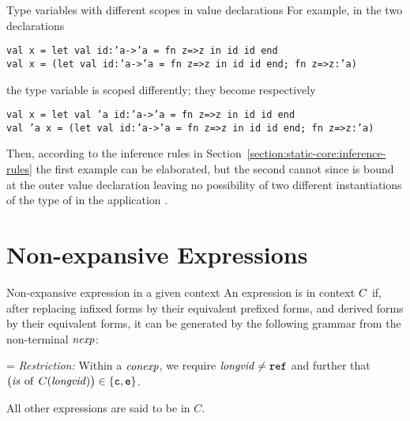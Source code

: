\begin{example}{Type variables with different scopes in value declarations}
For example, in the two declarations
\begin{tabbing}
\indent\=\tt  val x =  let val id:'a->'a = fn z=>z in id id end\\
       \>\tt  val x = (let val id:'a->'a = fn z=>z in id id end; fn z=>z:'a)
\end{tabbing}
the type variable  is scoped differently; they become respectively
\begin{tabbing}
\indent\=\tt val x =  let val 'a id:'a->'a = fn z=>z in id id end\\
       \>\tt val 'a x = (let val id:'a->'a = fn z=>z in id id end; fn z=>z:'a)
\end{tabbing}
Then, according to the inference rules in
Section~\ref{section:static-core:inference-rules}
the first example can be elaborated, but the second cannot since 
is bound at the outer value declaration leaving no possibility of two 
different instantiations of the type of  in the application
.
\end{example}

\section{Non-expansive Expressions}

\begin{definition}{Non-expansive expression in a given context}
An expression is  in context $C$ if, after
replacing infixed forms by their equivalent prefixed forms, and derived
forms by their equivalent forms, it can be generated by the following
grammar from the non-terminal $\textit{nexp\/}$:
\medskip


\hangindent=\parindent{}\noindent
{\sl Restriction:}\/ Within a $\textit{conexp\/}$, we require $\textit{longvid\/}\neq\mbox{\tt ref}$ and
further that $\bigl(\textit{is\/}\, \mathbin{\rm of} \,C(\textit{longvid\/})\bigr)\in\{\hbox{\tt c},\hbox{\tt e}\}$.\medskip

\noindent All other expressions are said to be  in $C$.
\end{definition}

